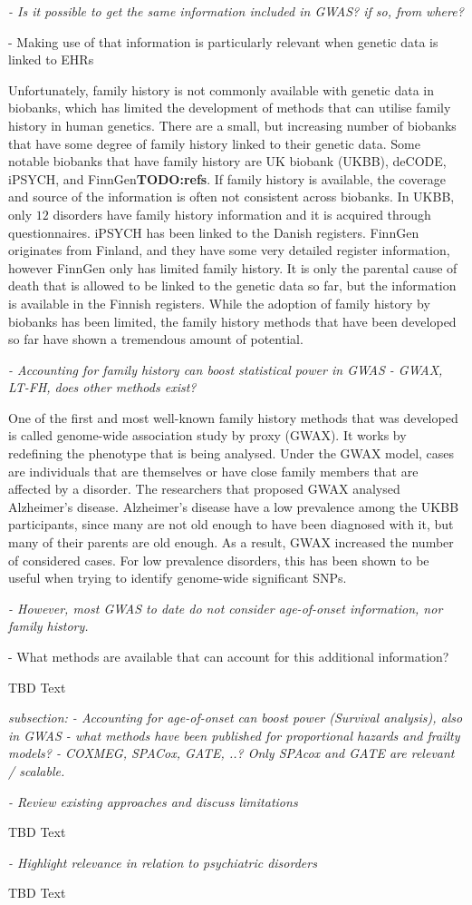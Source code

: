 {\itshape
- Is it possible to get the same information included in GWAS? if so, from where?

	- Making use of that information is particularly relevant when genetic data is linked to EHRs
}

Unfortunately, family history is not commonly available with genetic data in biobanks, which has limited the development of methods that can utilise family history in human genetics. There are a small, but increasing number of biobanks that have some degree of family history linked to their genetic data. Some notable biobanks that have family history are UK biobank (UKBB), deCODE, iPSYCH, and FinnGen\textbf{TODO:refs}. If family history is available, the coverage and source of the information is often not consistent across biobanks. In UKBB, only $ 12 $ disorders have family history information and it is acquired through questionnaires. iPSYCH has been linked to the Danish registers. FinnGen originates from Finland, and they have some very detailed register information, however FinnGen only has limited family history. It is only the parental cause of death that is allowed to be linked to the genetic data so far, but the information is available in the Finnish registers. While the adoption of family history by biobanks has been limited, the family history methods that have been developed so far have shown a tremendous amount of potential. 

{\itshape
	- Accounting for family history can boost statistical power in GWAS
	- GWAX, LT-FH, does other methods exist?
}

One of the first and most well-known family history methods that was developed is called genome-wide association study by proxy (GWAX). It works by redefining the phenotype that is being analysed. Under the GWAX model, cases are individuals that are themselves or have close family members that are affected by a disorder. The researchers that proposed GWAX analysed Alzheimer's disease. Alzheimer's disease have a low prevalence among the UKBB participants, since many are not old enough to have been diagnosed with it, but many of their parents are old enough. As a result, GWAX increased the number of considered cases. For low prevalence disorders, this has been shown to be useful when trying to identify genome-wide significant SNPs.



{\itshape
- However, most GWAS to date do not consider age-of-onset information, nor family history.

	- What methods are available that can account for this additional information?
}

TBD Text


{\itshape
subsection: 
- Accounting for age-of-onset can boost power (Survival analysis), also in GWAS 
	- what methods have been published for proportional hazards and frailty models?
		- COXMEG, SPACox, GATE, ..? Only SPAcox and GATE are relevant / scalable.
}


{\itshape
- Review existing approaches and discuss limitations
}

TBD Text

{\itshape
- Highlight relevance in relation to psychiatric disorders
}

TBD Text


